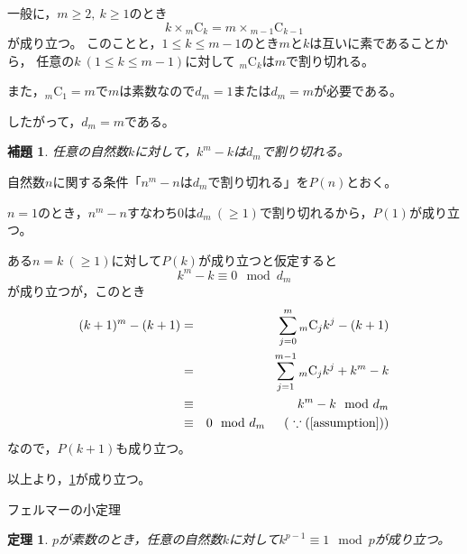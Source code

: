 \documentclass{article}
\makeatletter
\renewenvironment{proof}[1][\proofname]{\par
    \pushQED{\qed}
    \normalfont
    \topsep6\p@\@plus6\p@ \trivlist
    \item[\hskip\labelsep{\bfseries #1}\@addpunct{\bfseries}]\ignorespaces
}{%
    \popQED\endtrivlist\@endpefalse
}
\renewcommand{\proofname}{証明.}
\newtheorem{theorem}{定理}
\newtheorem{lemma}{補題}
\newcommand{\combination}[2]{{}_{#1} \mathrm{C}_{#2}}
\makeatother
\begin{document}
\begin{proof}
    一般に，$m \geq 2,\ k \geq 1$のとき
    \begin{equation*}
        k \times \combination{m}{k} = m \times \combination{m - 1}{k - 1}
    \end{equation*}
    が成り立つ。
    このことと，$1 \leq k \leq m - 1$のとき$m$と$k$は互いに素であることから，
    任意の$k\ (1 \leq k \leq m - 1)$に対して
    $\combination{m}{k}$は$m$で割り切れる。

    また，$\combination{m}{1} = m$で$m$は素数なので$d_m = 1$または$d_m = m$が必要である。

    したがって，$d_m = m$である。
\end{proof}

\begin{screen}
    \begin{lemma}
        \label{lemma:flt:2}
        任意の自然数$k$に対して，$k^m - k$は$d_m$で割り切れる。
    \end{lemma}
\end{screen}

\begin{proof}
    自然数$n$に関する条件「$n^m - n$は$d_m$で割り切れる」を$P(n)$とおく。

    $n = 1$のとき，$n^m - n$すなわち0は$d_m\ (\geq 1)$で割り切れるから，$P(1)$が成り立つ。

    ある$n = k\ (\geq 1)$に対して$P(k)$が成り立つと仮定すると
    \begin{equation}
        \label{assumption}
        k^m - k \equiv 0 \mod{d_m}
    \end{equation}
    が成り立つが，このとき
    \begin{eqnarray*}
        (k + 1)^m - (k + 1) &=& \sum_{j = 0}^{m} \combination{m}{j} k^j - (k + 1) \\
                            &=& \sum_{j = 1}^{m - 1} \combination{m}{j} k^j + k^m - k \\
                            &\equiv& k^m - k \mod{d_m} \\
                            &\equiv& 0 \mod{d_m} \hspace{15pt} (\ \because (\ref{assumption}) )
    \end{eqnarray*}
    なので，$P(k + 1)$も成り立つ。

    以上より，\cref{lemma:flt:2}が成り立つ。
\end{proof}

\begin{itembox}[l]{フェルマーの小定理}
    \begin{theorem}
        \label{theorem:flt}
        $p$が素数のとき，任意の自然数$k$に対して$k^{p - 1} \equiv 1 \mod{p}$が成り立つ。
    \end{theorem}
\end{itembox}
\end{document}
